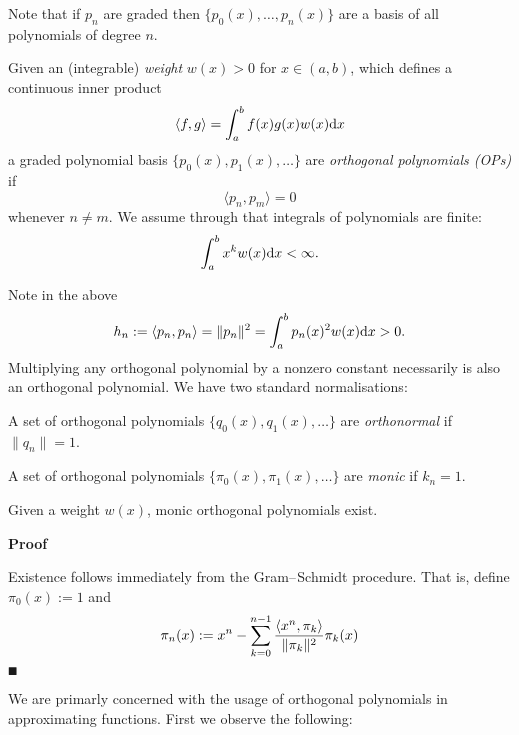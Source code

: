 Note that if $p_n$ are graded then $\{p_0(x), \ensuremath{\ldots}, p_n(x) \}$ are a basis of all polynomials of degree $n$.

\begin{definition} Given an (integrable) \emph{weight} $w(x) > 0$ for $x \ensuremath{\in} (a,b)$, which defines a continuous inner product
\[
\ensuremath{\langle}f,g\ensuremath{\rangle} = \ensuremath{\int}_a^b  f(x) g(x) w(x) {\rm d} x
\]
a graded polynomial basis $\{p_0(x), p_1(x), \ensuremath{\ldots} \}$ are \emph{orthogonal polynomials (OPs)} if
\[
\ensuremath{\langle}p_n,p_m\ensuremath{\rangle} = 0
\]
whenever $n \ensuremath{\neq} m$. We assume through that integrals of polynomials are finite:
\[
\ensuremath{\int}_a^b  x^k w(x) {\rm d} x < \ensuremath{\infty}.
\]
\end{definition}

Note in the above
\[
h_n := \ensuremath{\langle}p_n,p_n\ensuremath{\rangle} = \|p_n\|^2 = \ensuremath{\int}_a^b  p_n(x)^2 w(x) {\rm d} x > 0.
\]
Multiplying any orthogonal polynomial by a nonzero constant necessarily is also an orthogonal polynomial. We have two standard normalisations:

\begin{definition} A set of orthogonal polynomials $\{q_0(x), q_1(x), \ensuremath{\ldots} \}$ are \emph{orthonormal} if $\|q_n\| = 1$. \end{definition}

\begin{definition} A set of orthogonal polynomials $\{\ensuremath{\pi}_0(x), \ensuremath{\pi}_1(x), \ensuremath{\ldots} \}$ are \emph{monic} if $k_n = 1$. \end{definition}

\begin{proposition}[existence] Given a weight $w(x)$, monic orthogonal polynomials exist.

\end{proposition}
\textbf{Proof}

Existence follows immediately from the Gram\ensuremath{\endash}Schmidt procedure. That is, define $\ensuremath{\pi}_0(x) := 1$ and
\[
\ensuremath{\pi}_n(x) := x^n - \ensuremath{\sum}_{k=0}^{n-1} {\ensuremath{\langle}x^n,\ensuremath{\pi}_k\ensuremath{\rangle} \over \|\ensuremath{\pi}_k\|^2} \ensuremath{\pi}_k(x)
\]
\ensuremath{\QED}

We are primarly concerned with the usage of orthogonal polynomials in approximating functions. First we observe the following:

